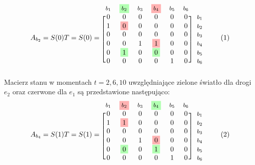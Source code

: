 \documentclass[12pt]{book}
\theoremstyle{plain}
\newcommand\addtag{\refstepcounter{equation}
\renewcommand{\labelenumii}{\theenumii}
\renewcommand{\theenumii}{\theenumi.\arabic{enumii}.}
\tag{\theequation}}
\begin{document}
\begin{equation*}
A_{b_2}=S(0)T=S(0)=
\begin{blockarray}{*{6}{c} l}
\begin{block}{*{6}{>{$\footnotesize}c<{$}} l}
$b_1$ & \colorbox{green!30}{$b_2$} & $b_3$ & \colorbox{red!30}{$b_4$} & $b_5$ & $b_6$ \\
\end{block}
\begin{block}{[*{6}{c}]>{$\footnotesize}l<{$}}
0 & 0                     & 0 & 0 & 0 & 0 & $b_1$ \\
1 & \colorbox{red!30}{0}  & 0 & 0 & 0 & 0 & $b_2$ \\
0 & 0                     & 0 & 0 & 0 & 0 &  $b_3$ \\
0 & 0                     & 1 & \colorbox{red!30}{1} & 0 & 0 & $b_4$ \\
0 & \colorbox{green!30}{1}  & 0 & \colorbox{green!30}{0} & 0 & 0 & $b_5$ \\
0 & 0                     & 0 & 0 & 1 & 0 & $b_6$ \\
\end{block}
\end{blockarray} \addtag
\end{equation*}
Macierz stanu w momentach $t=2,6,10$ uwzględniające zielone światło dla drogi $e_2$ oraz czerwone dla $e_1$ są przedstawione następująco:
\begin{equation*}
A_{b_4}=S(1)T=S(1)=
\begin{blockarray}{*{6}{c} l}
\begin{block}{*{6}{>{$\footnotesize}c<{$}} l}
$b_1$ & \colorbox{red!30}{$b_2$} & $b_3$ & \colorbox{green!30}{$b_4$} & $b_5$ & $b_6$ \\
\end{block}
\begin{block}{[*{6}{c}]>{$\footnotesize}l<{$}}
0 & 0                     & 0 & 0 & 0 & 0 & $b_1$ \\
1 & \colorbox{red!30}{1}  & 0 & 0 & 0 & 0 & $b_2$ \\
0 & 0                     & 0 & 0 & 0 & 0 &  $b_3$ \\
0 & 0                     & 1 & \colorbox{red!30}{0} & 0 & 0 & $b_4$ \\
0 & \colorbox{green!30}{0}  & 0 & \colorbox{green!30}{1} & 0 & 0 & $b_5$ \\
0 & 0                     & 0 & 0 & 1 & 0 & $b_6$ \\
\end{block}
\end{blockarray} \addtag
\end{equation*}
\end{document}
